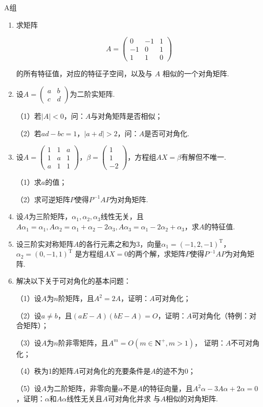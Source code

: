 \centerline{\heiti A组}
\begin{enumerate}
	\item 求矩阵

	$$
	A=\left(\begin{array}{ccc}
	0 & -1 & 1 \\
	-1 & 0 & 1 \\
	1 & 1 & 0
	\end{array}\right)
	$$
	
	的所有特征值，对应的特征子空间，以及与 $A$ 相似的一个对角矩阵.
	\item 设$A=\begin{pmatrix}
		a & b \\ c & d
	\end{pmatrix}$为二阶实矩阵.

	（1）若$|A|<0$，问：$A$与对角矩阵是否相似；

	（2）若$ad-bc=1$，$|a+d|>2$，问：$A$是否可对角化.
	\item 设$A=\begin{pmatrix}
		1 & 1 & a \\ 1 & a & 1 \\ a & 1 & 1
	\end{pmatrix}$，$\beta=\begin{pmatrix}
		1 \\ 1 \\ -2
	\end{pmatrix}$，方程组$AX=\beta$有解但不唯一.

	（1）求$a$的值；

	（2）求可逆矩阵$P$使得$P^{-1}AP$为对角矩阵.
	\item 设$A$为三阶矩阵，$\alpha_1,\alpha_2,\alpha_3$线性无关，且
	$A\alpha_1=\alpha_1,A\alpha_2=\alpha_1+\alpha_2-2\alpha_3,A\alpha_3
	=\alpha_1-2\alpha_2+\alpha_3$，求$A$的特征值.
	\item 设三阶实对称矩阵$A$的各行元素之和为3，向量$\alpha_1=(-1,2,-1)^\mathrm{T}$，$\alpha_2=(0,-1,1)^\mathrm{T}$
	是方程组$AX=0$的两个解，求矩阵$P$使得$P^{-1}AP$为对角矩阵.
	\item 解决以下关于可对角化的基本问题：
	
	（1）设$A$为$n$阶矩阵，且$A^2=2A$，证明：$A$可对角化；

	（2）设$a\neq b$，且$(aE-A)(bE-A)=O$，证明：$A$可对角化（特例：对合矩阵）；

	（3）设$A$为$n$阶非零矩阵，且$A^m=O(m\in\mathbf{N^+},m>1)$，
	证明：$A$不可对角化；

	（4）秩为1的矩阵$A$可对角化的充要条件是$A$的迹不为0；

	（5）设$A$为二阶矩阵，非零向量$\alpha$不是$A$的特征向量，且$A^2\alpha-
	3A\alpha+2\alpha=0$，证明：$\alpha$和$A\alpha$线性无关且$A$可对角化并求
	与$A$相似的对角矩阵.
\end{enumerate}
